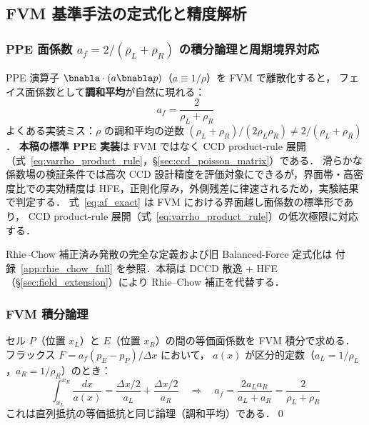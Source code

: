 \subsection{FVM 基準手法の定式化と精度解析}
\label{app:fvm_reference_methods}

\subsubsection{\texorpdfstring{PPE 面係数 $a_f = 2/(\rho_L+\rho_R)$ の積分論理と周期境界対応}{PPE 面係数 a\_f = 2/(ρ\_L+ρ\_R) の積分論理と周期境界対応}}
\label{app:fvm_face_coeff}
\label{sec:fvm_face_coeff}

PPE 演算子 $\bnabla\cdot(a\bnabla p)$（$a \equiv 1/\rho$）を FVM で離散化すると，
フェイス面係数として\textbf{調和平均}が自然に現れる：
\begin{equation}
  a_f = \frac{2}{\rho_L + \rho_R}
  \label{eq:af_exact}
\end{equation}
よくある実装ミス：$\rho$ の調和平均の逆数 $(\rho_L+\rho_R)/(2\rho_L\rho_R) \neq 2/(\rho_L+\rho_R)$．
\textbf{本稿の標準 PPE 実装}は FVM ではなく CCD product-rule 展開（式~\eqref{eq:varrho_product_rule}，§\ref{sec:ccd_poisson_matrix}）である．
滑らかな係数場の検証条件では高次 CCD 設計精度を評価対象にできるが，界面帯・高密度比での実効精度は
HFE，正則化厚み，外側残差に律速されるため，実験結果で判定する．
式~\eqref{eq:af_exact} は FVM における界面越し面係数の標準形であり，
CCD product-rule 展開（式~\eqref{eq:varrho_product_rule}）の低次極限に対応する．

Rhie--Chow 補正済み発散の完全な定義および旧 Balanced-Force 定式化は
付録~\ref{app:rhie_chow_full} を参照．本稿は DCCD 散逸 + HFE（§\ref{sec:field_extension}）により
Rhie--Chow 補正を代替する．

\subsubsection{FVM 積分論理}

セル $P$（位置 $x_L$）と $E$（位置 $x_R$）の間の等価面係数を FVM 積分で求める．
フラックス $F = a_f(p_E - p_P)/\Delta x$ において，
$a(x)$ が区分的定数（$a_L = 1/\rho_L$，$a_R = 1/\rho_R$）のとき：
\[
  \int_{x_L}^{x_R} \frac{dx}{a(x)}
  = \frac{\Delta x/2}{a_L} + \frac{\Delta x/2}{a_R}
  \quad\Rightarrow\quad
  a_f = \frac{2a_L a_R}{a_L+a_R}
  = \frac{2}{\rho_L+\rho_R}
\]
これは直列抵抗の等価抵抗と同じ論理（調和平均）である．\qed

